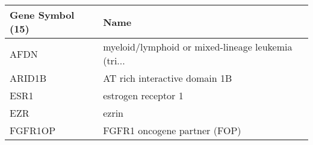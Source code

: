 \begin{tabular}{ll}
\toprule
Gene Symbol (15) &                                               Name \\
\midrule
            AFDN & myeloid/lymphoid or mixed-lineage leukemia (tri... \\
          ARID1B &                      AT rich interactive domain 1B \\
            ESR1 &                                estrogen receptor 1 \\
             EZR &                                              ezrin \\
         FGFR1OP &                       FGFR1 oncogene partner (FOP) \\
\bottomrule
\end{tabular}
